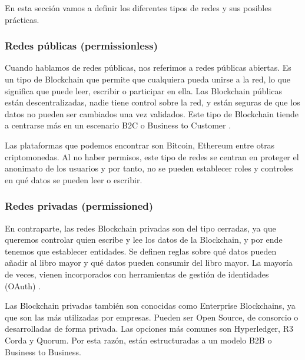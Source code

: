 \vspace{5mm}

\noindent En esta sección vamos a definir los diferentes tipos de redes y sus posibles prácticas.

\subsubsection*{Redes públicas (permissionless)}

Cuando hablamos de redes públicas, nos referimos a redes públicas abiertas. Es un tipo de Blockchain que permite que 
cualquiera pueda unirse a la red, lo que significa que puede leer, escribir o participar en ella. Las Blockchain 
públicas están descentralizadas, nadie tiene control sobre la red, y están seguras de que los datos no pueden ser 
cambiados una vez validados. Este tipo de Blockchain tiende a centrarse más en un escenario B2C o Business to Customer 
\cite{public-private-blockchain}.

\vspace{5mm}

\noindent Las plataformas que podemos encontrar son Bitcoin, Ethereum entre otras criptomonedas. Al no haber permisos,
este tipo de redes se centran en proteger el anonimato de los usuarios y por tanto, no se pueden establecer roles y
controles en qué datos se pueden leer o escribir.

\subsubsection*{Redes privadas (permissioned)}

En contraparte, las redes Blockchain privadas son del tipo cerradas, ya que queremos controlar quien escribe y lee los 
datos de la Blockchain, y por ende tenemos que establecer entidades. Se definen reglas sobre qué datos pueden añadir al 
libro mayor y qué datos pueden consumir del libro mayor. La mayoría de veces, vienen incorporados con herramientas de 
gestión de identidades (OAuth) \cite{public-private-blockchain}. 

\vspace{5mm}

\noindent Las Blockchain privadas también son conocidas como Enterprise Blockchains, ya que son las más utilizadas por 
empresas. Pueden ser Open Source, de consorcio o desarrolladas de forma privada. Las opciones más comunes son 
Hyperledger, R3 Corda y Quorum. Por esta razón, están estructuradas a un modelo B2B o Business to Business. 

